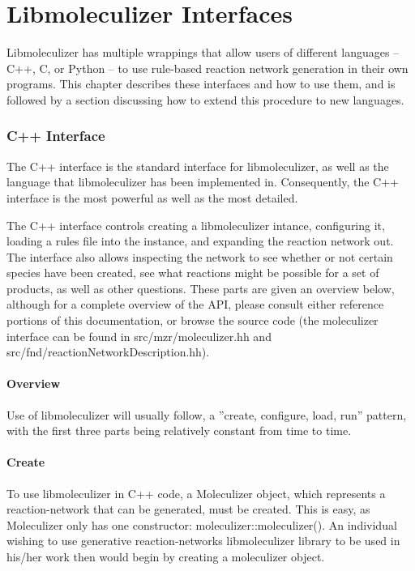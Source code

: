 \chapter{Libmoleculizer Interfaces}
\label{chap:interfacesChapter}

Libmoleculizer has multiple wrappings that allow users of different
languages -- C++, C, or Python -- to use rule-based reaction network
generation in their own programs.  This chapter describes these
interfaces and how to use them, and is followed by a section
discussing how to extend this procedure to new languages.

\subsection{C++ Interface}
The C++ interface is the standard interface for libmoleculizer, as
well as the language that libmoleculizer has been implemented in.
Consequently, the C++ interface is the most powerful as well as the
most detailed. 

The C++ interface controls creating a libmoleculizer intance,
configuring it, loading a rules file into the instance, and expanding
the reaction network out.  The interface also allows inspecting the
network to see whether or not certain species have been created, see
what reactions might be possible for a set of products, as well as
other questions.  These parts are given an overview below, although
for a complete overview of the API, please consult either reference
portions of this documentation, or browse the source code (the
moleculizer interface can be found in src/mzr/moleculizer.hh and
src/fnd/reactionNetworkDescription.hh).


\subsubsection{Overview}
Use of libmoleculizer will usually follow, a ''create, configure,
load, run'' pattern, with the first three parts being relatively
constant from time to time.  

\subsubsection{Create}
To use libmoleculizer in C++ code, a Moleculizer object, which
represents a reaction-network that can be generated, must be
created. This is easy, as Moleculizer only has one constructor:
moleculizer::moleculizer().  An individual wishing to use generative
reaction-networks libmoleculizer library to be used in his/her work
then would begin by creating a moleculizer object.  

